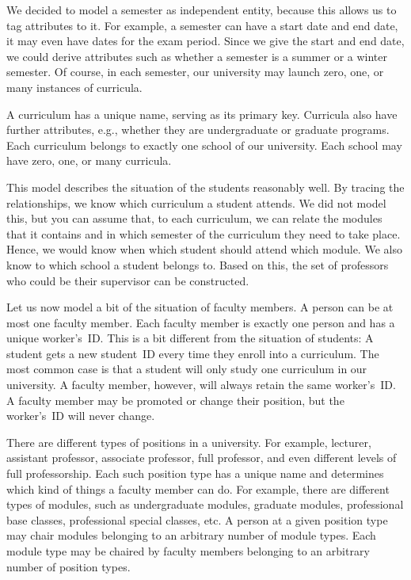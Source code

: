 We decided to model a semester as independent entity, because this allows us to tag attributes to it.
For example, a semester can have a start date and end date, it may even have dates for the exam period.
Since we give the start and end date, we could derive attributes such as whether a semester is a summer or a winter semester.
Of course, in each semester, our university may launch zero, one, or many instances of curricula.

A curriculum has a unique name, serving as its primary key.
Curricula also have further attributes, e.g., whether they are undergraduate or graduate programs.
Each curriculum belongs to exactly one school of our university.
Each school may have zero, one, or many curricula.

This model describes the situation of the students reasonably well.
By tracing the relationships, we know which curriculum a student attends.
We did not model this, but you can assume that, to each curriculum, we can relate the modules that it contains and in which semester of the curriculum they need to take place.
Hence, we would know when which student should attend which module.
We also know to which school a student belongs to.
Based on this, the set of professors who could be their supervisor can be constructed.

Let us now model a bit of the situation of faculty members.
A person can be at most one faculty member.
Each faculty member is exactly one person and has a unique worker's~ID.
This is a bit different from the situation of students:
A student gets a new student~ID every time they enroll into a curriculum.
The most common case is that a student will only study one curriculum in our university.
A faculty member, however, will always retain the same worker's~ID.
A faculty member may be promoted or change their position, but the worker's~ID will never change.

There are different types of positions in a university.
For example, lecturer, assistant professor, associate professor, full professor, and even different levels of full professorship.
Each such position type has a unique name and determines which kind of things a faculty member can do.
For example, there are different types of modules, such as undergraduate modules, graduate modules, professional base classes, professional special classes, etc.
A person at a given position type may chair modules belonging to an arbitrary number of module types.
Each module type may be chaired by faculty members belonging to an arbitrary number of position types.

